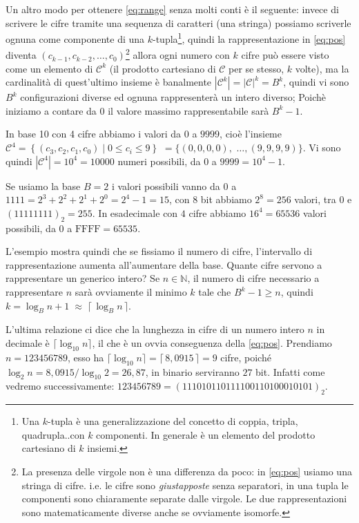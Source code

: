 Un altro modo  per
ottenere \eqref{eq:range} senza molti conti è il seguente: invece di scrivere
le cifre tramite una sequenza di caratteri (una stringa) possiamo scriverle
ognuna come componente di una $k$-tupla\footnote{Una $k$-tupla è una
generalizzazione del concetto di coppia, tripla, quadrupla..con $k$ componenti.
In generale è un elemento del prodotto cartesiano di $k$ insiemi.}, quindi la rappresentazione in \eqref{eq:pos} diventa $(c_{k-1}, c_{k-2}, \ldots,
c_0)$\footnote{La presenza delle virgole non è una differenza da poco: in
\eqref{eq:pos} usiamo una stringa di cifre. i.e. le cifre sono
\emph{giustapposte} senza separatori, in una tupla le componenti sono
chiaramente separate dalle virgole. Le due rappresentazioni sono
matematicamente diverse anche se ovviamente isomorfe.} allora ogni numero con
$k$ cifre può essere visto come un elemento di $\mathcal{C}^k$ (il prodotto cartesiano di $\mathcal{C}$ per se stesso, $k$ volte), ma
la cardinalità di quest'ultimo insieme è banalmente $|\mathcal{C}^k| =
|\mathcal{C}|^k = B^k$, quindi vi sono $B^k$ configurazioni
diverse ed ognuna rappresenterà un intero diverso; Poichè iniziamo
a contare da $0$ il valore massimo rappresentabile sarà $B^k-1$.

\begin{ex} In base 10 con 4 cifre abbiamo i valori da
$0$ a $9999$, cioè l'insieme $\mathcal{C}^4 =
\left\{ (c_3,c_2,c_1,c_0) \;|\; 0 \leq c_i \leq 9 \right\}$ $= \{
(0,0,0,0),$ $\ldots, (9,9,9,9) \}$. Vi sono quindi $|\mathcal{C}^4| = 10^4 = 10000$
numeri possibili, da $0$ a $9999 = 10^4-1$.\medskip

Se usiamo la base $B = 2$ i valori possibili vanno da $0$ a $1111 =
2^3+2^2+2^1+2^0 = 2^4-1 = 15$, con $8$ bit abbiamo $2^8 = 256$ valori, tra $0$
e $(11111111)_2 = 255$. In esadecimale con $4$ cifre abbiamo $16^4 = 65536$ valori possibili, da $0$ a $\text{FFFF} = 65535$. 
\end{ex}

L'esempio
mostra quindi che se fissiamo il numero di cifre, l'intervallo di rappresentazione aumenta all'aumentare della base. Quante cifre servono a rappresentare un generico intero? Se $n \in \mathbb{N}$, il numero di cifre necessario a rappresentare $n$ sarà ovviamente il minimo $k$ tale che $B^k-1 \geq n$, quindi $k = \log_B{n+1} \;\approx\; \lceil\, \log_B{n} \,\rceil$.

\begin{ex} 
L'ultima relazione ci dice che la lunghezza in cifre di un numero intero $n$ in
decimale è $\lceil\log_{10} n \rceil$, il che è un ovvia conseguenza della
\eqref{eq:pos}. Prendiamo $n = 123456789$, esso ha $\lceil \log_{10} n \rceil =
\lceil\, 8,0915 \,\rceil = 9$ cifre, poiché $\log_2{n} = 8,0915 / \log_{10}{2}
= 26,87$, in binario serviranno $27$ bit. Infatti come vedremo successivamente:
$123456789 = (111010110111100110100010101)_2$.
\end{ex}

